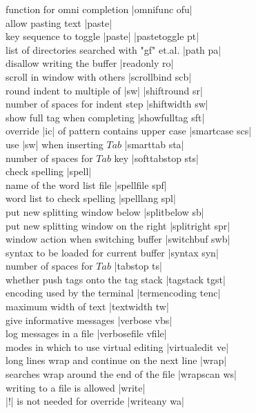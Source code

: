 \documentclass[10pt,a4paper,landscape]{article}
\begin{document}
\begin{multicols}{4}
function for omni completion			\dotfill|omnifunc ofu|\\
allow pasting text				\dotfill|paste|\\
key sequence to toggle |paste|			\dotfill|pastetoggle pt|\\
list of directories searched with "gf" et.al.	\dotfill|path pa|\\
disallow writing the buffer			\dotfill|readonly ro|\\
scroll in window with others			\dotfill|scrollbind scb|\\
round indent to multiple of |sw|		\dotfill|shiftround sr|\\
number of spaces for indent step		\dotfill|shiftwidth sw|\\
show full tag when completing			\dotfill|showfulltag sft|\\
override |ic| of pattern contains upper case	\dotfill|smartcase scs|\\
use |sw| when inserting $Tab$			\dotfill|smarttab sta|\\
number of spaces for $Tab$ key	 		\dotfill|softtabstop sts|\\
check spelling					\dotfill|spell|\\
name of the word list file			\dotfill|spellfile spf|\\
word list to check spelling			\dotfill|spelllang spl|\\
put new splitting window below			\dotfill|splitbelow sb|\\
put new splitting window on the right		\dotfill|splitright spr|\\
window action when switching buffer		\dotfill|switchbuf swb|\\
syntax to be loaded for current buffer		\dotfill|syntax syn|\\
number of spaces for $Tab$			\dotfill|tabstop ts|\\
whether push tags onto the tag stack		\dotfill|tagstack tgst|\\
encoding used by the terminal			\dotfill|termencoding tenc|\\
maximum width of text				\dotfill|textwidth tw|\\
give informative messages			\dotfill|verbose vbs|\\
log messages in a file				\dotfill|verbosefile vfile|\\
modes in which to use virtual editing 		\dotfill|virtualedit ve|\\
long lines wrap and continue on the next line	\dotfill|wrap|\\
searches wrap around the end of the file	\dotfill|wrapscan ws|\\
writing to a file is allowed			\dotfill|write|\\
|!| is not needed for override			\dotfill|writeany wa|


\end{multicols}
\end{document}
